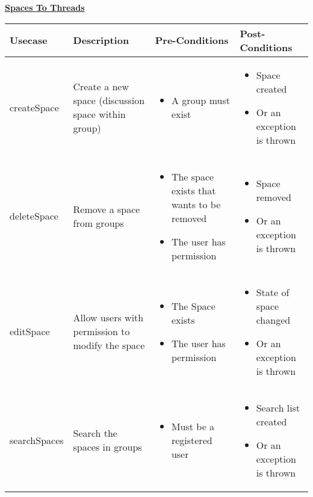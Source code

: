\documentclass{report}
\begin{document}
	
	\underline{\textbf{\LARGE Spaces To Threads}}
		\begin{longtable}{@{}|p{2.5cm}|p{3cm}|p{4cm}|p{4cm}|@{}}
			\toprule
			\textbf{Usecase} & \textbf{Description} & \textbf{Pre-Conditions} & \textbf{Post-Conditions} \\ \midrule
			
			createSpace& Create a new space (discussion space within group)& \begin{itemize} \item A group must exist \end{itemize}& \begin{itemize} \item Space created  \item Or an exception is thrown \end{itemize} \\ \midrule
			
			deleteSpace& Remove a space from groups& \begin{itemize} \item The space exists that wants to be removed \item The user has permission \end{itemize}& \begin{itemize} \item Space removed \item Or an exception is thrown \end{itemize} \\ \midrule
			
			editSpace& Allow users with permission to modify the space& \begin{itemize} \item The Space exists \item The user has permission \end{itemize}& \begin{itemize} \item State of space changed \item Or an exception is thrown \end{itemize} \\ \midrule
			
			searchSpaces& Search the spaces in groups& \begin{itemize} \item Must be a registered user \end{itemize}& \begin{itemize} \item Search list created \item Or an exception is thrown \end{itemize} \\ \midrule
			

\end{longtable}
\end{document}
